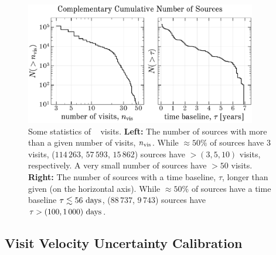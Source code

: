 \documentclass[modern]{aastex63}
\begin{document}
\begin{figure}[!t]
\begin{center}
\includegraphics[width=0.9\textwidth]{visitstats.pdf}
\end{center}
\caption{%
Some statistics of \apogee\  visits.
\textbf{Left:} The number of sources with more than a given number of visits,
$n_{\rm vis}$.
While $\approx$$50\%$ of sources have 3 visits, ($114\,263$, $57\,593$,
$15\,862$) sources have $> (3, 5, 10)$ visits, respectively.
A very small number of sources have $>50$ visits.
\textbf{Right:} The number of sources with a time baseline, $\tau$, longer than
given (on the horizontal axis).
While $\approx$$50\%$ of sources have a time baseline $\tau \lesssim 56~{\rm
days}$, ($88\,737$, $9\,743$) sources have $\tau > (100, 1\,000)~{\rm days}$.
\label{fig:visitstats}
}
\end{figure}


\subsection{Visit Velocity Uncertainty Calibration} \label{sec:visitcalib}
\end{document}
